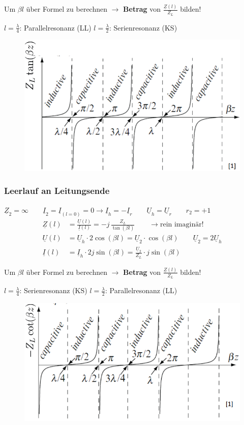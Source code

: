 Um $ \beta l $ über Formel zu berechnen $ \rightarrow $ \textbf{Betrag} von $
	\frac{\underline{Z}(l)}{Z_L} $ bilden!

$ l=\frac{\lambda}{4} $: Parallelresonanz (LL) \quad $ l=\frac{\lambda}{2} $: Serienresonanz (KS)

\begin{figure}[H]
	\centering
	\includegraphics[width=0.5\columnwidth]{Figures/Kurzgeschlossene_Leitung_diagramm.png}
\end{figure}


\subsubsection{Leerlauf an Leitungsende}
$ \underline{Z}_2 = \infty \qquad \underline{I}_2 = \underline{I}_{(l=0)} = 0 \rightarrow \underline{I}_h = - \underline{I}_r \qquad \underline{U}_h = \underline{U}_r  \qquad r_2 = +1$
\begin{align*}
	\underline{Z}(l) & = \frac{\underline{U}(l)}{\underline{I}(l)}  = -j \,\frac{Z_L}{\tan(\beta l)}\qquad\rightarrow \text{rein imaginär!}    \\
	\underline{U}(l) & = \underline{U}_h \cdot 2 \cos(\beta l) = \underline{U}_2 \cdot \cos(\beta l) \qquad \underline{U}_2 = 2\underline{U}_h \\
	\underline{I}(l) & = \underline{I}_h\cdot 2j\sin(\beta l) = \frac{\underline{U}_2}{Z_L} \cdot  j \sin(\beta l)
\end{align*}

Um $ \beta l $ über Formel zu berechnen $ \rightarrow $ \textbf{Betrag} von $
	\frac{\underline{Z}(l)}{Z_L} $ bilden!

$ l=\frac{\lambda}{4} $: Serienresonanz (KS) \quad $ l=\frac{\lambda}{2} $:
Parallelresonanz (LL)

\begin{figure}[H]
	\centering
	\includegraphics[width=0.5\columnwidth]{Figures/Leerlaufende_Leitung.png}
\end{figure}


